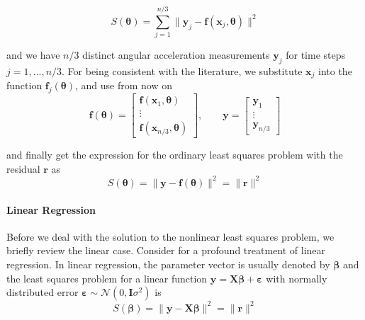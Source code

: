 \begin{equation}
\label{eq:cost_f_x_theta}
S(\boldsymbol{\theta}) = \sum_{j=1}^{n/3} \| \mathbf{y}_j - \mathbf{f}(\mathbf{x}_j, \boldsymbol{\theta}) \|^2
\end{equation}

and we have $n/3$ distinct angular acceleration measurements $\mathbf{y}_j$ for time steps $j=1,...,n/3$.
For being consistent with the literature, we substitute $\mathbf{x}_j$ into the function $\mathbf{f}_j(\boldsymbol{\theta})$, and use from now on
\begin{equation}
\mathbf{f}(\boldsymbol{\theta}) = \left[ \begin{array}{c}
\mathbf{f}(\mathbf{x}_1, \boldsymbol{\theta}) \\
\vdots \\
\mathbf{f}(\mathbf{x}_{n/3}, \boldsymbol{\theta})
\end{array} \right]
, \qquad
\mathbf{y} = \left[ \begin{array}{c}
\mathbf{y}_1 \\
\vdots \\
\mathbf{y}_{n/3} 
\end{array} \right]
\end{equation}

and finally get the expression for the ordinary least squares problem with the residual $\mathbf{r}$ as
\begin{equation}
\label{eq:cost_ols}
S(\boldsymbol{\theta}) = \| \mathbf{y} - \mathbf{f}(\boldsymbol{\theta}) \|^2 = \| \mathbf{r} \|^2
\end{equation}

\paragraph{Linear Regression\\}
Before we deal with the solution to the nonlinear least squares problem, we briefly review the linear case. Consider \citet[chap. 5]{Draper} for a profound treatment of linear regression.
In linear regression, the parameter vector is usually denoted by $\boldsymbol{\beta}$ and the least squares problem for a linear function 
$\mathbf{y} = \mathbf{X} \boldsymbol{\beta} + \boldsymbol{\varepsilon}$ 
with normally distributed error 
$\boldsymbol{\varepsilon} \sim \mathcal{N}(0,\mathbf{I} \sigma^2)$ 
is
\begin{equation}
S(\boldsymbol{\beta}) = \| \mathbf{y} - \mathbf{X}\boldsymbol{\beta} \|^2 = \| \mathbf{r} \|^2
\end{equation}

